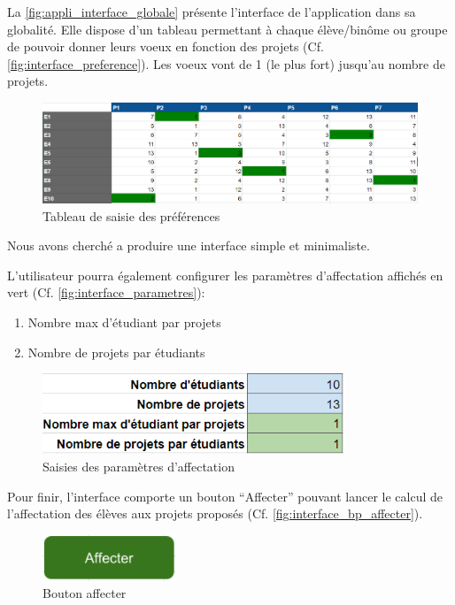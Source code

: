 \documentclass[final,poster]{polytech/polytech}
\begin{document}
La \autoref{fig:appli_interface_globale} présente l'interface de l'application dans sa globalité.
Elle dispose d'un tableau permettant à chaque élève/binôme ou groupe de pouvoir donner leurs voeux en fonction des projets (Cf. \autoref{fig:interface_preference}). Les voeux vont de 1 (le plus fort) jusqu’au nombre de projets.

\begin{figure}
\includegraphics[width=15cm]{images/interface_preferences}
\caption{\label{fig:interface_preference}Tableau de saisie des préférences}
\end{figure}

Nous avons cherché a produire une interface simple et minimaliste.

L'utilisateur pourra également configurer les paramètres d'affectation affichés en vert (Cf. \autoref{fig:interface_parametres}):
\begin{enumerate}
\item Nombre max d’étudiant par projets
\item Nombre de projets par étudiants
\end{enumerate}

\begin{figure}[htbp]
\includegraphics[width=9cm]{images/interface_parametres}
\caption{\label{fig:interface_parametres} Saisies des paramètres d'affectation}
\end{figure}

Pour finir, l’interface comporte un bouton “Affecter” pouvant lancer le calcul de l’affectation des élèves aux projets proposés (Cf. \autoref{fig:interface_bp_affecter}). 

\begin{figure}[htbp]
\includegraphics[width=4cm]{images/interface_bp_affecter}
\caption{\label{fig:interface_bp_affecter} Bouton affecter}
\end{figure}
\end{document}
